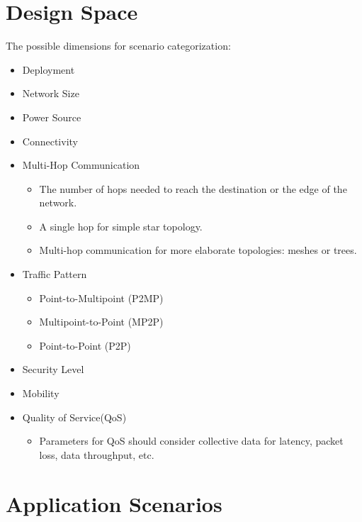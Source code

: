 \documentclass[10pt]{beamer}
\begin{document}
\section{Design Space}
\begin{frame}
    The possible dimensions for scenario categorization\cite{rfc6568}:
    \begin{itemize}
        \item Deployment
        \item Network Size
        \item Power Source
        \item Connectivity
        \item Multi-Hop Communication
            \begin{itemize}
                \item The number of hops needed to reach the destination or the edge of the network.
                \item A single hop for simple star topology.
                \item Multi-hop communication for more elaborate topologies: meshes or trees.
            \end{itemize}
        \item Traffic Pattern
            \begin{itemize}
                \item Point-to-Multipoint (P2MP)
                \item Multipoint-to-Point (MP2P)
                \item Point-to-Point (P2P)
            \end{itemize}
        \item Security Level
        \item Mobility
        \item Quality of Service(QoS)
            \begin{itemize}
                \item Parameters for QoS should consider collective data for latency, packet loss, data throughput, etc.
            \end{itemize}
    \end{itemize}
\end{frame}

\section{Application Scenarios}
\end{document}
